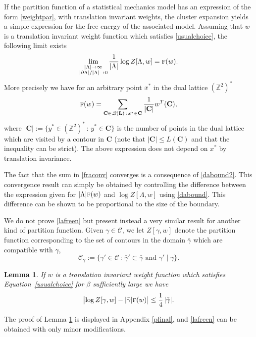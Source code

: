 \documentclass[10pt]{amsart}
\let\mathcal\mathscr
\newcommand{\sep}{\,:\,}
\numberwithin{equation}{section}
\theoremstyle{plain}
\newtheorem{lemma}[theorem]{Lemma}
\theoremstyle{definition}
\newcommand{\cQ}{{\ensuremath{\mathcal Q}} }
\newcommand{\cC}{{\ensuremath{\mathcal C}} }
\newcommand{\bC}{{\ensuremath{\mathbf C}} }
\newcommand{\bL}{{\ensuremath{\mathbf L}} }
\newcommand{\limtwo}[2]{\lim_{\substack{#1 \\ #2}}}
\newcommand{\bbZ}{{\ensuremath{\mathbb Z}} }
\newcommand{\gb}{\beta}
\newcommand{\gL}{\Lambda}
\newcommand{\tf}{\textsc{f}}
\begin{document}
If the partition function of a statistical mechanics model has an expression of the form \eqref{weightpar},
with translation invariant weights, the cluster expansion yields a simple expression for the free energy of the associated model.
Assuming that $w$ is a translation invariant weight function which satisfies \eqref{usualchoice},
the following limit exists\vspace*{-3pt}
\begin{equation}\label{lafreen}
\limtwo{|\gL| \to \infty}{|\partial\gL|/|\gL|\to 0} \frac{1}{|\gL|} \log Z[ \gL,w]=\tf(w).
\end{equation}
More precisely we have for an arbitrary point $x^*$ in the dual lattice $(\bbZ^2)^*$
\begin{equation}\label{fraconv}
\tf(w)=\sum_{\bC \in \cQ(\bL) \sep x^*\in \bC} \frac{1}{|\bC|}w^T(\bC),
\end{equation}
where $|\bC|:=\{y^*\in (\bbZ^2)^*\sep y^*\in \bC \}$ is the number of points in the dual lattice which are visited by a contour in $\bC$
(note that $|\bC|\le L(\bC)$ and that the inequality can be strict). The above expression does not depend on $x^*$ by translation invariance.

The fact that the sum in \eqref{fraconv} converges is a consequence of \eqref{dabound2}.
This convergence result can simply be obtained by controlling the difference between the expression given for
$|\gL|\tf(w)$ and $\log Z[ \gL,w]$ using \eqref{dabound}. This difference can be shown to be proportional to the size of the boundary.

We do not prove \eqref{lafreen} but present instead a very similar result for another kind of partition function. Given $\gamma\in \cC$, we let $Z[\gamma,w]$ denote the
partition function corresponding to the set of contours in the domain $\bar \gamma$ which are compatible with $\gamma$,
\begin{equation*}%
\cC_{\gamma}:= \{ \gamma'\in \cC \sep \bar \gamma'\subset \bar\gamma \text{ and } \gamma'\mid \gamma\}.
\end{equation*}

\begin{lemma}\label{finalfrontier}
If $w$ is a translation invariant weight function which satisfies Equation~\eqref{usualchoice} for $\gb$ sufficiently large
we have
\begin{equation*}
\bigl |\log Z[\gamma,w]- |\bar\gamma|\tf(w) \bigr|\le \frac 1 4\, |\tilde \gamma|.
\end{equation*}
\end{lemma}
The proof of Lemma \ref{finalfrontier} is displayed in Appendix \ref{pfinal}, and \eqref{lafreen} can be obtained with only minor modifications.
\end{document}
